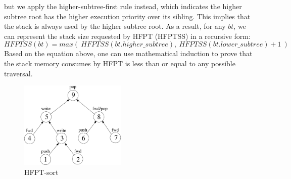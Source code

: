 but we apply the higher-subtree-first rule instead, 
which indicates the higher subtree root has the higher execution priority over its sibling.
This implies that the stack is always used by the higher subtree root.
As a result, for any $bt$, we can represent the stack size requested by HFPT (HFPTSS) in a recursive form:
\begin{equation*}
    HFPTSS(bt) = max(\ HFPTSS(bt.higher\_subtree),\ HFPTSS(bt.lower\_subtree) + 1\ )
\end{equation*}
Based on the equation above, one can use mathematical induction to prove that the stack memory consumes by HFPT is less than or equal to any possible traversal.
\begin{figure}[!h]
    \begin{center}
        \includegraphics[width=0.45\textwidth]{figs/hfpt.eps}
    \end{center}
    \caption{HFPT-sort}
    \label{fig:hfpt}
\end{figure}%
